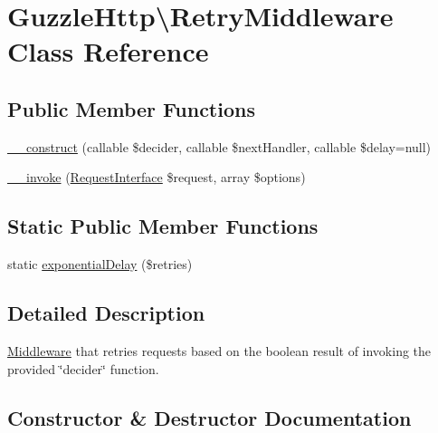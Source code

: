 \hypertarget{classGuzzleHttp_1_1RetryMiddleware}{}\section{Guzzle\+Http\textbackslash{}Retry\+Middleware Class Reference}
\label{classGuzzleHttp_1_1RetryMiddleware}
\subsection*{Public Member Functions}
\begin{DoxyCompactItemize}
\item 
\hyperlink{classGuzzleHttp_1_1RetryMiddleware_a37d60034001482447967732bd1a1344a}{\+\_\+\+\_\+construct} (callable \$decider, callable \$next\+Handler, callable \$delay=null)
\item 
\hyperlink{classGuzzleHttp_1_1RetryMiddleware_a31ec131078ab18cf48e60b4c49421e77}{\+\_\+\+\_\+invoke} (\hyperlink{interfacePsr_1_1Http_1_1Message_1_1RequestInterface}{Request\+Interface} \$request, array \$options)
\end{DoxyCompactItemize}
\subsection*{Static Public Member Functions}
\begin{DoxyCompactItemize}
\item 
static \hyperlink{classGuzzleHttp_1_1RetryMiddleware_a58e4bf0447e9ab1237d72da22b444fa6}{exponential\+Delay} (\$retries)
\end{DoxyCompactItemize}


\subsection{Detailed Description}
\hyperlink{classGuzzleHttp_1_1Middleware}{Middleware} that retries requests based on the boolean result of invoking the provided \char`\"{}decider\char`\"{} function. 

\subsection{Constructor \& Destructor Documentation}
\mbox{\label{classGuzzleHttp_1_1RetryMiddleware_a37d60034001482447967732bd1a1344a}} 
